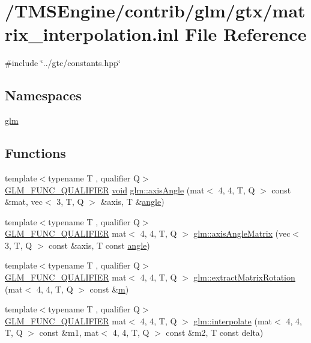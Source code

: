 \hypertarget{matrix__interpolation_8inl}{}\section{/\+T\+M\+S\+Engine/contrib/glm/gtx/matrix\+\_\+interpolation.inl File Reference}
\label{matrix__interpolation_8inl}
{\ttfamily \#include \char`\"{}../gtc/constants.\+hpp\char`\"{}}\newline
\subsection*{Namespaces}
\begin{DoxyCompactItemize}
\item 
 \hyperlink{namespaceglm}{glm}
\end{DoxyCompactItemize}
\subsection*{Functions}
\begin{DoxyCompactItemize}
\item 
{\footnotesize template$<$typename T , qualifier Q$>$ }\\\hyperlink{setup_8hpp_a33fdea6f91c5f834105f7415e2a64407}{G\+L\+M\+\_\+\+F\+U\+N\+C\+\_\+\+Q\+U\+A\+L\+I\+F\+I\+ER} \hyperlink{_s_d_l__opengles2__gl2ext_8h_ae5d8fa23ad07c48bb609509eae494c95}{void} \hyperlink{group__gtx__matrix__interpolation_ga97f160158906ea89676f56cc4697ec98}{glm\+::axis\+Angle} (mat$<$ 4, 4, T, Q $>$ const \&mat, vec$<$ 3, T, Q $>$ \&axis, T \&\hyperlink{_s_d_l__opengl__glext_8h_a9e06c1f76a20fed54ca742cd25cb02c4}{angle})
\item 
{\footnotesize template$<$typename T , qualifier Q$>$ }\\\hyperlink{setup_8hpp_a33fdea6f91c5f834105f7415e2a64407}{G\+L\+M\+\_\+\+F\+U\+N\+C\+\_\+\+Q\+U\+A\+L\+I\+F\+I\+ER} mat$<$ 4, 4, T, Q $>$ \hyperlink{group__gtx__matrix__interpolation_ga992a5db71893ed1ba6ebac99f0f69831}{glm\+::axis\+Angle\+Matrix} (vec$<$ 3, T, Q $>$ const \&axis, T const \hyperlink{_s_d_l__opengl__glext_8h_a9e06c1f76a20fed54ca742cd25cb02c4}{angle})
\item 
{\footnotesize template$<$typename T , qualifier Q$>$ }\\\hyperlink{setup_8hpp_a33fdea6f91c5f834105f7415e2a64407}{G\+L\+M\+\_\+\+F\+U\+N\+C\+\_\+\+Q\+U\+A\+L\+I\+F\+I\+ER} mat$<$ 4, 4, T, Q $>$ \hyperlink{group__gtx__matrix__interpolation_ga8834d4499a1a52fcf531b4506f0b5f67}{glm\+::extract\+Matrix\+Rotation} (mat$<$ 4, 4, T, Q $>$ const \&\hyperlink{_s_d_l__opengl__glext_8h_af593500c283bf1a787a6f947f503a5c2}{m})
\item 
{\footnotesize template$<$typename T , qualifier Q$>$ }\\\hyperlink{setup_8hpp_a33fdea6f91c5f834105f7415e2a64407}{G\+L\+M\+\_\+\+F\+U\+N\+C\+\_\+\+Q\+U\+A\+L\+I\+F\+I\+ER} mat$<$ 4, 4, T, Q $>$ \hyperlink{group__gtx__matrix__interpolation_gad5fc63a2e084000b39f6508ab07421a5}{glm\+::interpolate} (mat$<$ 4, 4, T, Q $>$ const \&m1, mat$<$ 4, 4, T, Q $>$ const \&m2, T const delta)
\end{DoxyCompactItemize}
